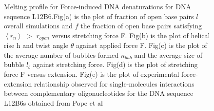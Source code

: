 \documentclass[12pt,masters,final]{UTRGVthesis}
\begin{document}
\begin{figure}[!h]
\caption{\small Melting profile for Force-induced DNA denaturations for DNA sequence L12B6.Fig(a) is the plot of fraction of open base pairs $l$ overall simulations and $f$ the fraction of open base pairs satisfying $\left<r_n\right>$ $>$ $r_{open}$ versus stretching force F. Fig(b) is the plot of helical rise h and twist angle $\theta$ against applied force F. Fig(c) is the plot of the average number of bubbles formed  $n_{bub}$ and the average  size of bubble $l_b$ against stretching force. Fig(d) is the plot of stretching force F versus extension. Fig(e) is the plot of  experimental force-extension relationship observed for single-molecules interactions between complementary oligonucleotides for the DNA sequence L12B6s obtained from Pope et al}
\label{fig:L12B6}    

\end{figure} 
%
\newpage
\end{document}

